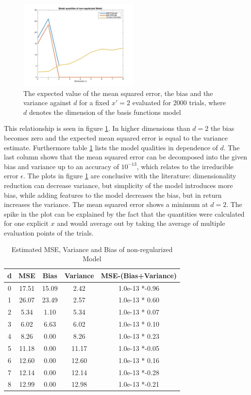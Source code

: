 \documentclass[a4]{article}
\begin{document}
\begin{figure}[!h]
	\begin{center}
		\centering
		\includegraphics[width=6cm]{../figures/NonReg}
	\end{center}
	\caption{\label{fig:NonReg} The expected value of the mean squared error, the bias and the variance against $d$ for a fixed $x'=2$ evaluated for 2000 trials, where $d$ denotes the dimension of the basis functions model}
\end{figure}

This relationship is seen in figure \ref{fig:NonReg}. In higher dimensions than $d=2$ the bias becomes zero and the expected mean squared error is equal to the variance estimate. Furthermore table \ref{table:EvalD} lists the model qualities in dependence of $d$. The last column shows that the mean squared error can be decomposed into the given bias and variance up to an accuracy of $10^{-13}$, which relates to the irreducible error $\epsilon$.
The plots in figure \ref{fig:NonReg} are conclusive with the literature: dimensionality reduction can decrease variance, but simplicity of the model introduces more bias, while adding features to the model decreases the bias, but in return increases the variance. 
The mean squared error shows a minimum at $d=2$. The spike in the plot can be explained by the fact that the quantities were calculated for one explicit $x$ and would average out by taking the average of multiple evaluation points of the trials.

\begin{table} [h]
	\caption{Estimated MSE, Variance and Bias of non-regularized Model}
	\centering
	\label{table:EvalD}
	\begin{tabular}{c c c c c}
		\toprule
		d &MSE &  Bias &  Variance  & MSE-(Bias+Variance)\\ 
		\midrule
		0& 17.51&  15.09 &  2.42   & 1.0e-13 *-0.96\\
		1& 26.07&  23.49  &  2.57 & 1.0e-13 * 0.60 \\
		2& 5.34&  1.10 & 5.34  &1.0e-13 * 0.07 \\
		3& 6.02&  6.63  & 6.02  & 1.0e-13 * 0.10 \\
		 4& 8.26&  0.00 &  8.26  & 1.0e-13 * 0.23 \\
		 5&11.18&  0.00  &  11.17  & 1.0e-13 *-0.05  \\
		 6& 12.60& 0.00  &  12.60  & 1.0e-13 * 0.16 \\
		7&12.14&  0.00  &  12.14 & 1.0e-13 *-0.28\\
		8& 12.99 &  0.00 &   12.98  & 1.0e-13 *-0.21 \\
		\bottomrule
	\end{tabular}
\end{table}
\end{document}
